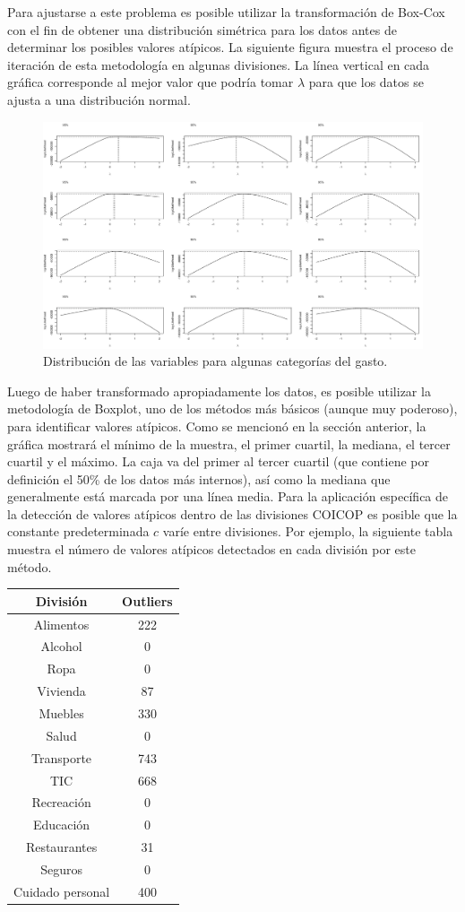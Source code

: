 \documentclass[
  10pt,
  spanish,
]{book}
\begin{document}
Para ajustarse a este problema es posible utilizar la transformación de Box-Cox con el fin de obtener una distribución simétrica para los datos antes de determinar los posibles valores atípicos. La siguiente figura muestra el proceso de iteración de esta metodología en algunas divisiones. La línea vertical en cada gráfica corresponde al mejor valor que podría tomar \(\lambda\) para que los datos se ajusta a una distribución normal.

\begin{figure}
\centering
\includegraphics{Pics/ou1.png}
\caption{Distribución de las variables para algunas categorías del gasto.}
\end{figure}

Luego de haber transformado apropiadamente los datos, es posible utilizar la metodología de Boxplot, uno de los métodos más básicos (aunque muy poderoso), para identificar valores atípicos. Como se mencionó en la sección anterior, la gráfica mostrará el mínimo de la muestra, el primer cuartil, la mediana, el tercer cuartil y el máximo. La caja va del primer al tercer cuartil (que contiene por definición el 50\% de los datos más internos), así como la mediana que generalmente está marcada por una línea media. Para la aplicación específica de la detección de valores atípicos dentro de las divisiones COICOP es posible que la constante predeterminada \(c\) varíe entre divisiones. Por ejemplo, la siguiente tabla muestra el número de valores atípicos detectados en cada división por este método.

\begin{longtable}[]{@{}cc@{}}
\toprule
División & Outliers \\
\midrule
\endhead
Alimentos & 222 \\
Alcohol & 0 \\
Ropa & 0 \\
Vivienda & 87 \\
Muebles & 330 \\
Salud & 0 \\
Transporte & 743 \\
TIC & 668 \\
Recreación & 0 \\
Educación & 0 \\
Restaurantes & 31 \\
Seguros & 0 \\
Cuidado personal & 400 \\
\bottomrule
\end{longtable}
\end{document}
